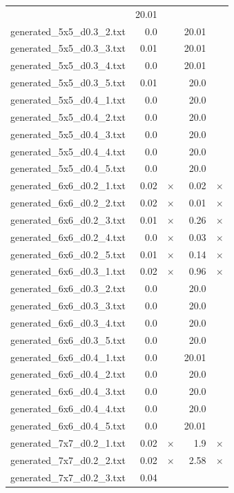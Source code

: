 \begin{center}
\begin{tabular}{lrrrr}
 & 20.01 & 
\\
generated\_5x5\_d0.3\_2.txt & 0.0 & 
 & 20.01 & 
\\
generated\_5x5\_d0.3\_3.txt & 0.01 & 
 & 20.01 & 
\\
generated\_5x5\_d0.3\_4.txt & 0.0 & 
 & 20.01 & 
\\
generated\_5x5\_d0.3\_5.txt & 0.01 & 
 & 20.0 & 
\\
generated\_5x5\_d0.4\_1.txt & 0.0 & 
 & 20.0 & 
\\
generated\_5x5\_d0.4\_2.txt & 0.0 & 
 & 20.0 & 
\\
generated\_5x5\_d0.4\_3.txt & 0.0 & 
 & 20.0 & 
\\
generated\_5x5\_d0.4\_4.txt & 0.0 & 
 & 20.0 & 
\\
generated\_5x5\_d0.4\_5.txt & 0.0 & 
 & 20.0 & 
\\
generated\_6x6\_d0.2\_1.txt & 0.02 & 
$\times$
 & 0.02 & 
$\times$
\\
generated\_6x6\_d0.2\_2.txt & 0.02 & 
$\times$
 & 0.01 & 
$\times$
\\
generated\_6x6\_d0.2\_3.txt & 0.01 & 
$\times$
 & 0.26 & 
$\times$
\\
generated\_6x6\_d0.2\_4.txt & 0.0 & 
$\times$
 & 0.03 & 
$\times$
\\
generated\_6x6\_d0.2\_5.txt & 0.01 & 
$\times$
 & 0.14 & 
$\times$
\\
generated\_6x6\_d0.3\_1.txt & 0.02 & 
$\times$
 & 0.96 & 
$\times$
\\
generated\_6x6\_d0.3\_2.txt & 0.0 & 
 & 20.0 & 
\\
generated\_6x6\_d0.3\_3.txt & 0.0 & 
 & 20.0 & 
\\
generated\_6x6\_d0.3\_4.txt & 0.0 & 
 & 20.0 & 
\\
generated\_6x6\_d0.3\_5.txt & 0.0 & 
 & 20.0 & 
\\
generated\_6x6\_d0.4\_1.txt & 0.0 & 
 & 20.01 & 
\\
generated\_6x6\_d0.4\_2.txt & 0.0 & 
 & 20.0 & 
\\
generated\_6x6\_d0.4\_3.txt & 0.0 & 
 & 20.0 & 
\\
generated\_6x6\_d0.4\_4.txt & 0.0 & 
 & 20.0 & 
\\
generated\_6x6\_d0.4\_5.txt & 0.0 & 
 & 20.01 & 
\\
generated\_7x7\_d0.2\_1.txt & 0.02 & 
$\times$
 & 1.9 & 
$\times$
\\
generated\_7x7\_d0.2\_2.txt & 0.02 & 
$\times$
 & 2.58 & 
$\times$
\\
generated\_7x7\_d0.2\_3.txt & 0.04 & 

\end{tabular}
\end{center}
